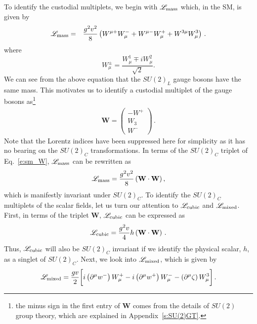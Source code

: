 \documentclass[11pt]{article}
\begin{document}
%
To identify the custodial multiplets, we begin with $\mathscr{L}_{\rm mass}$ which, in the SM, is given by
\begin{eqnarray}
	\label{e:sm_lmass1}
	\mathscr{L}_{\rm{mass}} &=& \frac{g^2 v^2}{8}\left(W^{\mu+}W_\mu^-  + W^{\mu-}W_\mu^+ + W^{3  \mu}W_\mu^3  \right) \, .
\end{eqnarray}
where 
\begin{equation}
W_\mu^{ \pm} = \dfrac{W_\mu^{1} \mp i W_\mu^{2}}{\sqrt{2}}. 
\end{equation}
%
We can see from the above equation that the $SU(2)_L$ gauge bosons have the same mass.  
This motivates us to identify a custodial multiplet of the gauge bosons as\footnote{the minus sign in the first entry of $\mathbf{W}$ comes from the details of $SU(2)$ group theory, which are explained in Appendix~\ref{s:SU(2)GT}.} 
\begin{eqnarray}
	\label{e:sm_W}
	\textbf{W}=\begin{pmatrix}
		-W^+\\W_3\\W^-
	\end{pmatrix} \,.
\end{eqnarray}
%
Note that the Lorentz indices have been suppressed here for simplicity as it has no bearing on the $SU(2)_C$ transformations.  
In terms of the $SU(2)_C$ triplet of Eq.~\eqref{e:sm_W}, $\mathscr{L}_{\rm mass}$ can be rewritten as 
%
\begin{eqnarray}
	\label{e:sm_lmass}
	\mathscr{L}_{\rm{mass}}=\frac{g^2 v^2}{8}\left(\textbf{W}\cdot\textbf{W}\right),
\end{eqnarray}
%
which is manifestly invariant under $SU(2)_C$.  
To identify the $SU(2)_C$ multiplets of the scalar fields, let us turn our attention to $\mathscr{L}_{\rm cubic}$ and $\mathscr{L}_{\rm mixed}$.  
First, in terms of the triplet $\mathbf{W}$, $\mathscr{L}_{\rm cubic}$ can be expressed as
\begin{eqnarray}
	\label{e:sm_lcubic}
	\mathscr{L}_{\rm{cubic}} = \frac{g^2v}{4}h\left(\textbf{W}\cdot\textbf{W}\right) \, .
\end{eqnarray}
Thus, $\mathscr{L}_{\rm cubic}$ will also be $SU(2)_C$ invariant if we identify the physical scalar, $h$, as a singlet of $SU(2)_C$.  
Next, we look into $\mathscr{L}_{\rm mixed}$, which is given by
%
\begin{eqnarray}
	\label{e:sm_lmix1}
	\mathscr{L}_{\rm{mixed}}=  \frac{gv}{2}   \bigg[i\left(\partial^\mu w^-\right) W_\mu^+  -  i\left(\partial^\mu w^+\right)W_\mu^-  -  \left(\partial^\mu \zeta\right) W_\mu^3 \bigg]\, .
\end{eqnarray}
\end{document}
